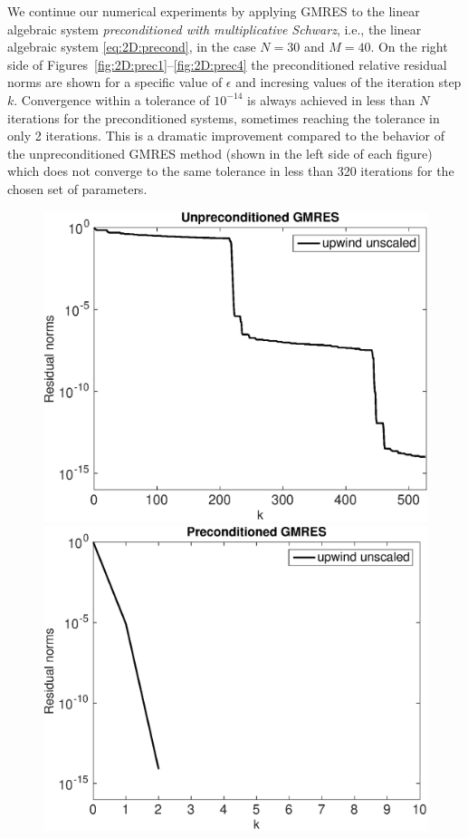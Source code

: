 We continue our numerical experiments  by applying GMRES to the linear
algebraic system \emph{preconditioned with multiplicative Schwarz}, i.e., the
linear algebraic system \eqref{eq:2D:precond}, in the case $N=30$ and $M=40$.
On the right side of Figures~\ref{fig:2D:prec1}--\ref{fig:2D:prec4} the
preconditioned relative residual norms are shown for a specific value of
$\epsilon$ and incresing values of the iteration step $k$. Convergence within a
tolerance of $10^{-14}$ is always achieved in less than $N$ iterations for the
preconditioned systems, sometimes reaching the tolerance in only 2 iterations.
This is a dramatic improvement compared to the behavior of the unpreconditioned
GMRES method (shown in the left side of each figure) which does not converge to
the same tolerance in less than 320 iterations for the chosen set of parameters.
%
\begin{figure}[tbhp]
\hspace*{-0.5em}
\begin{minipage}[t]{0.5\linewidth}
\includegraphics[width=0.95\linewidth]{figures/gmres_upwind2D_eps_1e-08_N_30_M_40}
\vspace*{-1em}
\end{minipage}
%
\begin{minipage}[t]{0.5\linewidth}
\includegraphics[width=0.95\linewidth]{figures/gmres_precond_upwind2D_eps_1e-06_N_30_M_40}

\end{minipage}
\end{figure}
